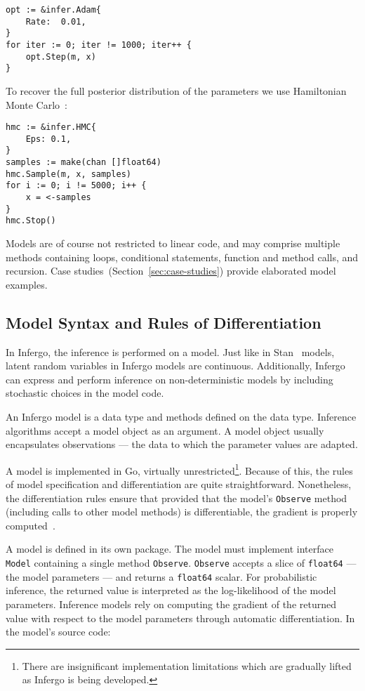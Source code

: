 \documentclass[sigplan,review,10pt,anonymous]{acmart}
\begin{document}
\begin{sloppypar}
\begin{lstlisting}
opt := &infer.Adam{
    Rate:  0.01,
}
for iter := 0; iter != 1000; iter++ {
    opt.Step(m, x)
}
\end{lstlisting}

To recover the full posterior distribution of
the parameters we use Hamiltonian Monte Carlo~\cite{N12}:

\begin{lstlisting}
hmc := &infer.HMC{
	Eps: 0.1,
}
samples := make(chan []float64)
hmc.Sample(m, x, samples)
for i := 0; i != 5000; i++ {
	x = <-samples
}
hmc.Stop()
\end{lstlisting}

Models are of course not restricted to linear code, and may
comprise multiple methods containing loops, conditional
statements, function and method calls, and recursion. Case
studies~(Section~\ref{sec:case-studies}) provide elaborated
model examples.

\subsection{Model Syntax and Rules of Differentiation}

In Infergo, the inference is performed on a model. Just like in
Stan~\cite{Stan17} models, latent random variables in Infergo
models are continuous. Additionally, Infergo can express and
perform inference on non-deterministic models by including
stochastic choices in the model code.

An Infergo model is a data type and methods defined on the data
type.  Inference algorithms accept a model object as an
argument.  A model object usually encapsulates observations ---
the data to which the parameter values are adapted.

A model is implemented in Go, virtually
unrestricted\footnote{There are insignificant implementation
limitations which are gradually lifted as Infergo is being
developed.}. Because of this, the rules of model specification
and differentiation are quite straightforward. Nonetheless, the
differentiation rules ensure that provided that the model's
\lstinline{Observe} method (including calls to other model methods)
is differentiable, the gradient is properly computed~\cite{GW08}.

A model is defined in its own package. The model must
implement interface \lstinline{Model} containing a single method
\lstinline{Observe}. \lstinline{Observe} accepts a slice of
\lstinline{float64} --- the model parameters --- and returns a
\lstinline{float64} scalar. For probabilistic inference, the
returned value is interpreted as the log-likelihood of the model
parameters. Inference models rely on computing the gradient of
the returned value with respect to the model parameters through
automatic differentiation. In the model's source code:


\end{sloppypar}
\end{document}
